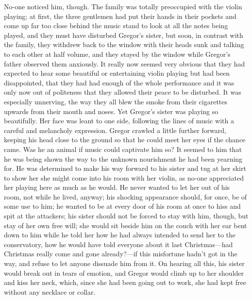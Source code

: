 No-one noticed him, though. The family was totally preoccupied with the
violin playing; at first, the three gentlemen had put their hands in
their pockets and come up far too close behind the music stand to look
at all the notes being played, and they must have disturbed Gregor’s
sister, but soon, in contrast with the family, they withdrew back to
the window with their heads sunk and talking to each other at half
volume, and they stayed by the window while Gregor’s father observed
them anxiously. It really now seemed very obvious that they had
expected to hear some beautiful or entertaining violin playing but had
been disappointed, that they had had enough of the whole performance
and it was only now out of politeness that they allowed their peace to
be disturbed. It was especially unnerving, the way they all blew the
smoke from their cigarettes upwards from their mouth and noses. Yet
Gregor’s sister was playing so beautifully. Her face was leant to one
side, following the lines of music with a careful and melancholy
expression. Gregor crawled a little further forward, keeping his head
close to the ground so that he could meet her eyes if the chance came.
Was he an animal if music could captivate him so? It seemed to him that
he was being shown the way to the unknown nourishment he had been
yearning for. He was determined to make his way forward to his sister
and tug at her skirt to show her she might come into his room with her
violin, as no-one appreciated her playing here as much as he would. He
never wanted to let her out of his room, not while he lived, anyway;
his shocking appearance should, for once, be of some use to him; he
wanted to be at every door of his room at once to hiss and spit at the
attackers; his sister should not be forced to stay with him, though,
but stay of her own free will; she would sit beside him on the couch
with her ear bent down to him while he told her how he had always
intended to send her to the conservatory, how he would have told
everyone about it last Christmas—had Christmas really come and gone
already?—if this misfortune hadn’t got in the way, and refuse to let
anyone dissuade him from it. On hearing all this, his sister would
break out in tears of emotion, and Gregor would climb up to her
shoulder and kiss her neck, which, since she had been going out to
work, she had kept free without any necklace or collar.

